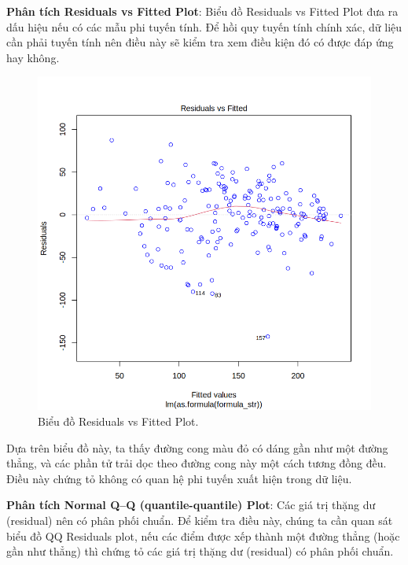 \textbf{Phân tích Residuals vs Fitted Plot}: Biểu đồ Residuals vs Fitted Plot đưa ra dấu hiệu nếu có các mẫu phi tuyến tính. Để hồi quy tuyến tính chính xác, dữ liệu cần phải tuyến tính nên điều này sẽ kiểm tra xem điều kiện đó có được đáp ứng hay không.

\begin{figure}[H]
    \centering
    \includegraphics[width=0.75\columnwidth]{csm_figures/best_csm_model_residual_fitted.png}
    \caption{Biểu đồ Residuals vs Fitted Plot.}
    \label{fig:best_model_fig2}
\end{figure}

Dựa trên biểu đồ này, ta thấy đường cong màu đỏ có dáng gần như một đường thẳng, và các phần tử trải dọc theo đường cong này một cách tương đồng đều. Điều này chứng tỏ không có quan hệ phi tuyến xuất hiện trong dữ liệu.

\textbf{Phân tích Normal Q–Q (quantile-quantile) Plot}: Các giá trị thặng dư (residual) nên có phân phối chuẩn. Để kiểm tra điều này, chúng ta cần quan sát biểu đồ QQ Residuals plot, nếu các điểm được xếp thành một đường thẳng (hoặc gần như thẳng) thì chứng tỏ các giá trị thặng dư (residual) có phân phối chuẩn.

